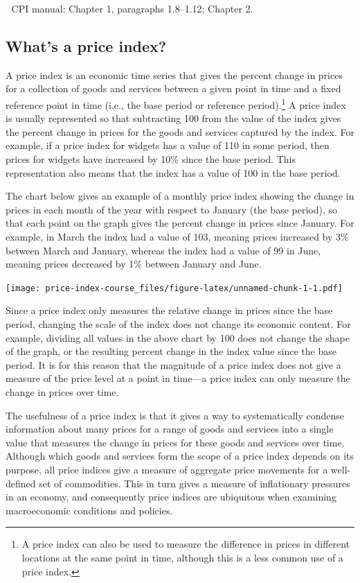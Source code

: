 \documentclass[]{article}
\begin{document}
📖 CPI manual: Chapter 1, paragraphs 1.8--1.12; Chapter 2.

\hypertarget{whats-a-price-index}{%
\subsection{What's a price index?}\label{whats-a-price-index}}

A price index is an economic time series that gives the percent change in prices for a collection of goods and services between a given point in time and a fixed reference point in time (i.e., the base period or reference period).\footnote{A price index can also be used to measure the difference in prices in different locations at the same point in time, although this is a less common use of a price index.} A price index is usually represented so that subtracting 100 from the value of the index gives the percent change in prices for the goods and services captured by the index. For example, if a price index for widgets has a value of 110 in some period, then prices for widgets have increased by 10\% since the base period. This representation also means that the index has a value of 100 in the base period.

The chart below gives an example of a monthly price index showing the change in prices in each month of the year with respect to January (the base period), so that each point on the graph gives the percent change in prices since January. For example, in March the index had a value of 103, meaning prices increased by 3\% between March and January, whereas the index had a value of 99 in June, meaning prices decreased by 1\% between January and June.

\texttt{[image: price-index-course\_files/figure-latex/unnamed-chunk-1-1.pdf]}

Since a price index only measures the relative change in prices since the base period, changing the scale of the index does not change its economic content. For example, dividing all values in the above chart by 100 does not change the shape of the graph, or the resulting percent change in the index value since the base period. It is for this reason that the magnitude of a price index does not give a measure of the price level at a point in time---a price index can only measure the change in prices over time.

The usefulness of a price index is that it gives a way to systematically condense information about many prices for a range of goods and services into a single value that measures the change in prices for these goods and services over time. Although which goods and services form the scope of a price index depends on its purpose, all price indices give a measure of aggregate price movements for a well-defined set of commodities. This in turn gives a measure of inflationary pressures in an economy, and consequently price indices are ubiquitous when examining macroeconomic conditions and policies.
\end{document}
